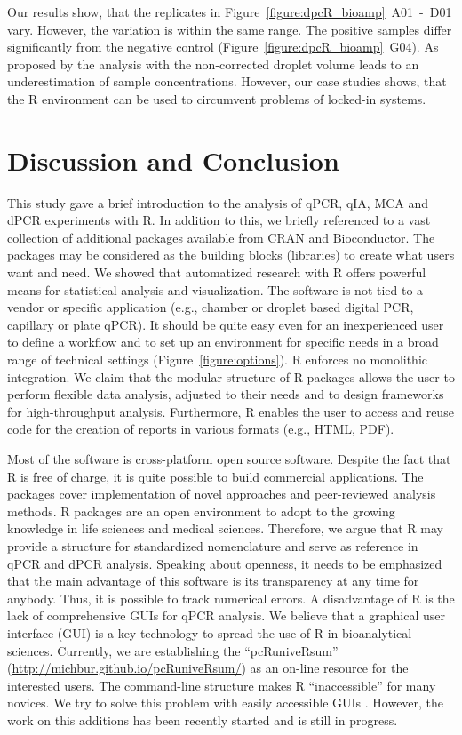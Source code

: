Our results show, that the replicates in 
Figure~\ref{figure:dpcR_bioamp}~A01~-~D01 vary. However, the variation is within 
the same range. The positive samples differ significantly from the negative 
control (Figure~\ref{figure:dpcR_bioamp}~G04). As proposed by 
\citet{corbisier_2015} the analysis with the non-corrected droplet volume leads 
to an underestimation of sample concentrations. However, our case studies shows, 
that the R environment can be used to circumvent problems of locked-in systems.

\section{Discussion and Conclusion}

This study gave a brief introduction to the analysis of qPCR, qIA, MCA and dPCR 
experiments with R. In addition to this, we briefly referenced to a vast 
collection of additional packages available from CRAN and Bioconductor. The 
packages may be considered as the building blocks (libraries) to create what 
users want and need. We showed that automatized research with R offers powerful 
means for statistical analysis and visualization. The software is not tied to a 
vendor or specific application (e.g., chamber or droplet based digital PCR, 
capillary or plate qPCR). It should be quite easy even for an inexperienced user 
to define a workflow and to set up an environment for specific needs in a broad 
range of technical settings (Figure~\ref{figure:options}). R enforces no 
monolithic integration. We claim that the modular structure of R packages allows 
the user to perform flexible data analysis, adjusted to their needs and to 
design frameworks for high-throughput analysis. Furthermore, R enables the user 
to access and reuse code for the creation of reports in various formats (e.g., 
HTML, PDF).

Most of the software is cross-platform open source software. Despite the fact 
that R is free of charge, it is quite possible to build commercial applications. 
The packages cover implementation of novel approaches and peer-reviewed analysis 
methods. R packages are an open environment to adopt to the growing knowledge in 
life sciences and medical sciences. Therefore, we argue that R may provide a 
structure for standardized nomenclature and serve as reference in qPCR and dPCR 
analysis. Speaking about openness, it needs to be emphasized that the main 
advantage of this software is its transparency at any time for anybody. Thus, it 
is possible to track numerical errors.  A disadvantage of R is the lack of 
comprehensive GUIs for qPCR analysis. We believe that a graphical user interface 
(GUI) is a key technology to spread the use of R in bioanalytical sciences. 
Currently, we are establishing the ``pcRuniveRsum'' 
(\url{http://michbur.github.io/pcRuniveRsum/}) as an on-line resource for the 
interested users. The command-line structure makes R ``inaccessible'' for many 
novices. We try to solve this problem with easily accessible GUIs 
\citep{rodiger_rkward_2012}. However, the work on this additions has been 
recently started and is still in progress.

